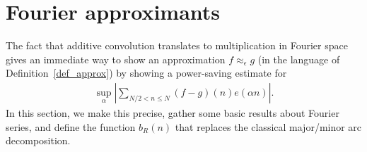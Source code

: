 \documentclass[12pt]{amsart}
\theoremstyle{definition}
\theoremstyle{remark}
\numberwithin{equation}{section}
\newcommand{\1}{\mathbf{1}}
\begin{document}
\section{Fourier approximants}\label{sec:fouapprox}


The fact that additive convolution translates to multiplication in Fourier space gives an immediate way to show an approximation $f\approx_\epsilon g$ (in the language of Definition~\ref{def_approx}) by showing a power-saving estimate for 
\begin{align*}
    \sup_\alpha \left|\sum_{N/2< n\leq N}(f-g)(n)e(\alpha n)\right|.
\end{align*}
In this section, we make this precise, gather some basic results about Fourier series, and define the function $b_R(n)$ that replaces the classical major/minor arc decomposition. 
\end{document}
